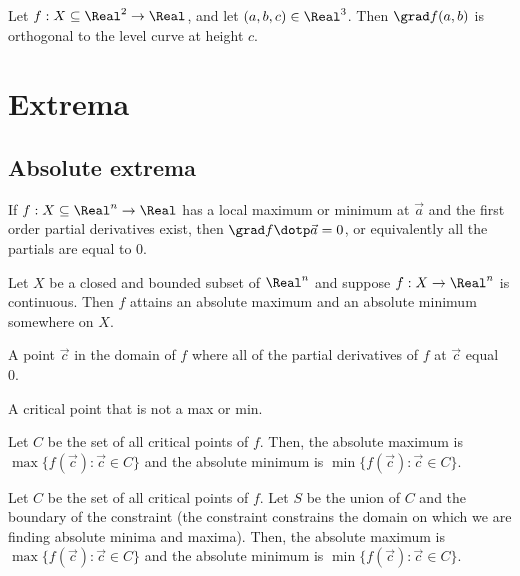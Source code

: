 \begin{theorem}
  Let $f : X \subseteq \Real^2 \to \Real$, and let $(a, b, c) \in \Real^3$. Then $\grad f(a, b)$ is orthogonal to the level curve at height $c$.
\end{theorem}

\section{Extrema}

\subsection{Absolute extrema}


\begin{theorem}
  If $f : X \subseteq \Real^n \to \Real$ has a local maximum or minimum at $\vec{a}$ and the first order partial derivatives exist, then $\grad f \dotp \vec{a} = 0$, or equivalently all the partials are equal to 0.
\end{theorem}

\begin{namedtheorem}
  Let $X$ be a closed and bounded subset of $\Real^n$ and suppose $f : X \to \Real^n$ is continuous. Then $f$ attains an absolute maximum and an absolute minimum somewhere on $X$.
\end{namedtheorem}

\begin{definition}
  A point $\vec{c}$ in the domain of $f$ where all of the partial derivatives of $f$ at $\vec{c}$ equal 0.
\end{definition}

\begin{definition}
  A critical point that is not a max or min.
\end{definition}

\begin{theorem}
  Let $C$ be the set of all critical points of $f$. Then, the absolute maximum is $\max \{f(\vec{c}) : \vec{c} \in C\}$ and the absolute minimum is $\min \{f(\vec{c}) : \vec{c} \in C\}$.
\end{theorem}

\begin{theorem}
  Let $C$ be the set of all critical points of $f$. Let $S$ be the union of $C$ and the boundary of the constraint (the constraint constrains the domain on which we are finding absolute minima and maxima). Then, the absolute maximum is $\max \{f(\vec{c}) : \vec{c} \in C\}$ and the absolute minimum is $\min \{f(\vec{c}) : \vec{c} \in C\}$.
\end{theorem}

